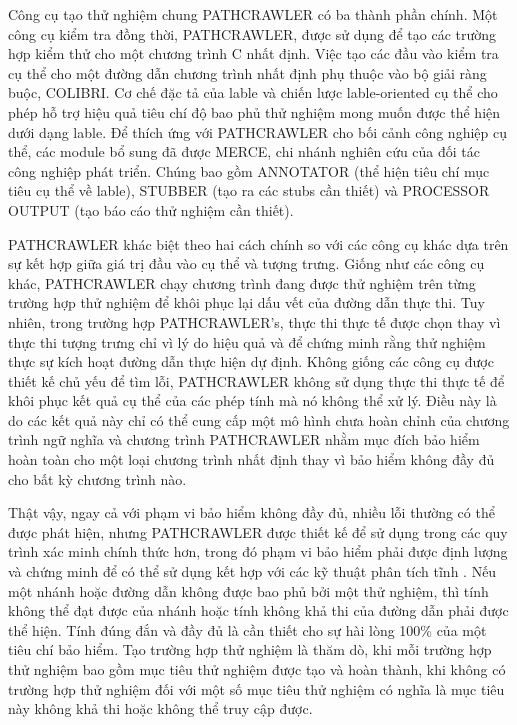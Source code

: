 \documentclass[12pt,a4paper]{article}
\begin{document}
Công cụ tạo thử nghiệm chung PATHCRAWLER có ba thành phần chính. Một công cụ kiểm tra đồng thời, PATHCRAWLER, được sử dụng để tạo các trường hợp kiểm thử cho một chương trình C nhất định. Việc tạo các đầu vào kiểm tra cụ thể cho một đường dẫn chương trình nhất định phụ thuộc vào bộ giải ràng buộc, COLIBRI. Cơ chế đặc tả của lable và chiến lược lable-oriented cụ thể cho phép hỗ trợ hiệu quả tiêu chí độ bao phủ thử nghiệm mong muốn được thể hiện dưới dạng lable. Để thích ứng với PATHCRAWLER cho bối cảnh công nghiệp cụ thể, các module bổ sung đã được MERCE, chi nhánh nghiên cứu của đối tác công nghiệp phát triển. Chúng bao gồm ANNOTATOR (thể hiện tiêu chí mục tiêu cụ thể về lable), STUBBER (tạo ra các stubs cần thiết) và PROCESSOR OUTPUT (tạo báo cáo thử nghiệm cần thiết).

\indent PATHCRAWLER khác biệt theo hai cách chính so với các công cụ khác dựa trên sự kết hợp giữa giá trị đầu vào cụ thể và tượng trưng. Giống như các công cụ khác, PATHCRAWLER chạy chương trình đang được thử nghiệm trên từng trường hợp thử nghiệm để khôi phục lại dấu vết của đường dẫn thực thi. Tuy nhiên, trong trường hợp PATHCRAWLER's, thực thi thực tế được chọn thay vì thực thi tượng trưng chỉ vì lý do hiệu quả và để chứng minh rằng thử nghiệm thực sự kích hoạt đường dẫn thực hiện dự định. Không giống các công cụ được thiết kế chủ yếu để tìm lỗi, PATHCRAWLER không sử dụng thực thi thực tế để khôi phục kết quả cụ thể của các phép tính mà nó không thể xử lý. Điều này là do các kết quả này chỉ có thể cung cấp một mô hình chưa hoàn chỉnh của chương trình ngữ nghĩa và chương trình PATHCRAWLER nhằm mục đích bảo hiểm hoàn toàn cho một loại chương trình nhất định thay vì bảo hiểm không đầy đủ cho bất kỳ chương trình nào.

\indent Thật vậy, ngay cả với phạm vi bảo hiểm không đầy đủ, nhiều lỗi thường có thể được phát hiện, nhưng PATHCRAWLER được thiết kế để sử dụng trong các quy trình xác minh chính thức hơn, trong đó phạm vi bảo hiểm phải được định lượng và chứng minh để có thể sử dụng kết hợp với các kỹ thuật phân tích tĩnh \cite{petiot2014test}. Nếu một nhánh hoặc đường dẫn không được bao phủ bởi một thử nghiệm, thì tính không thể đạt được của nhánh hoặc tính không khả thi của đường dẫn phải được thể hiện. Tính đúng đắn và đầy đủ là cần thiết cho sự hài lòng 100\% của một tiêu chí bảo hiểm. Tạo trường hợp thử nghiệm là thăm dò, khi mỗi trường hợp thử nghiệm bao gồm mục tiêu thử nghiệm được tạo và hoàn thành, khi không có trường hợp thử nghiệm đối với một số mục tiêu thử nghiệm có nghĩa là mục tiêu này không khả thi hoặc không thể truy cập được.
\end{document}
